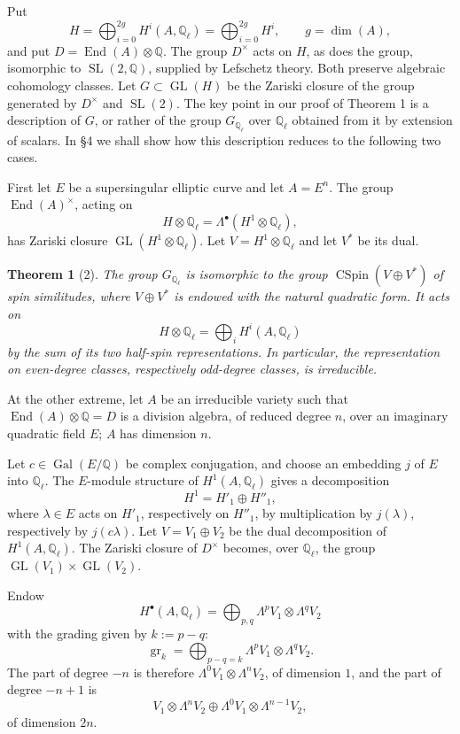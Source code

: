 \documentclass[11pt]{article}
\newcommand{\Q}{\mathbb Q}
\newcommand{\Gal}{\operatorname{Gal}}
\newcommand{\End}{\operatorname{End}}
\newcommand{\GL}{\operatorname{GL}}
\newcommand{\SL}{\operatorname{SL}}
\newcommand{\CSpin}{\operatorname{CSpin}}
\newcommand{\gr}{\operatorname{gr}}
\theoremstyle{deligne}
\newtheorem*{theorem*}{Theorem}
\begin{document}
Put
\[
H=\bigoplus_{i=0}^{2g}H^i(A,\Q_\ell)=\bigoplus_{i=0}^{2g}H^i,
\qquad g=\dim(A),
\]
and put $D=\End(A)\otimes\Q$. The group $D^\times$ acts on $H$, as does the group, isomorphic to $\SL(2,\Q)$, supplied by Lefschetz theory. Both preserve algebraic cohomology classes. Let $G\subset\GL(H)$ be the Zariski closure of the group generated by $D^\times$ and $\SL(2)$. The key point in our proof of Theorem 1 is a description of $G$, or rather of the group $G_{\Q_\ell}$ over $\Q_\ell$ obtained from it by extension of scalars. In \S4 we shall show how this description reduces to the following two cases.

First let $E$ be a supersingular elliptic curve and let $A=E^n$. The group $\End(A)^\times$, acting on
\[
H\otimes\Q_\ell=\Lambda^\bullet(H^1\otimes\Q_\ell),
\]
has Zariski closure $\GL(H^1\otimes\Q_\ell)$. Let $V=H^1\otimes\Q_\ell$ and let $V^*$ be its dual.

\begin{theorem*}[2]
The group $G_{\Q_\ell}$ is isomorphic to the group $\CSpin(V\oplus V^*)$ of spin similitudes, where $V\oplus V^*$ is endowed with the natural quadratic form. It acts on
\[
H\otimes\Q_\ell=\bigoplus_i H^i(A,\Q_\ell)
\]
by the sum of its two half-spin representations. In particular, the representation on even-degree classes, respectively odd-degree classes, is irreducible.
\end{theorem*}

At the other extreme, let $A$ be an irreducible variety such that $\End(A)\otimes\Q=D$ is a division algebra, of reduced degree $n$, over an imaginary quadratic field $E$; $A$ has dimension $n$.

Let $c\in\Gal(E/\Q)$ be complex conjugation, and choose an embedding $j$ of $E$ into $\Q_\ell$. The $E$-module structure of $H^1(A,\Q_\ell)$ gives a decomposition
\[
H^1=H'_1\oplus H''_1,
\]
where $\lambda\in E$ acts on $H'_1$, respectively on $H''_1$, by multiplication by $j(\lambda)$, respectively by $j(c\lambda)$. Let $V=V_1\oplus V_2$ be the dual decomposition of $H^1(A,\Q_\ell)$. The Zariski closure of $D^\times$ becomes, over $\Q_\ell$, the group $\GL(V_1)\times\GL(V_2)$.

Endow
\[
H^\bullet(A,\Q_\ell)=\bigoplus_{p,q}\Lambda^p V_1\otimes\Lambda^q V_2
\]
with the grading given by $k:=p-q$:
\begin{equation}\tag{1.1}
\gr_k=\bigoplus_{p-q=k}\Lambda^p V_1\otimes\Lambda^q V_2 .
\end{equation}
The part of degree $-n$ is therefore $\Lambda^0V_1\otimes\Lambda^nV_2$, of dimension $1$, and the part of degree $-n+1$ is
\[
V_1\otimes\Lambda^nV_2\oplus\Lambda^0V_1\otimes\Lambda^{n-1}V_2,
\]
of dimension $2n$.
\end{document}
